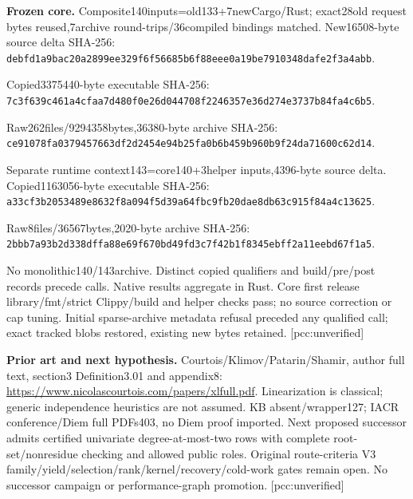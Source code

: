 \documentclass[10pt]{article}
\begin{document}
\textbf{Frozen core.} Composite140inputs=old133+7newCargo/Rust; exact28old
request bytes reused,7archive round-trips/36compiled bindings matched.
New16508-byte source delta SHA-256:\\
\texttt{debfd1a9bac20a2899ee329f6f56685b6f88eee0a19be7910348dafe2f3a4abb}.\par
Copied3375440-byte executable SHA-256:\\
\texttt{7c3f639c461a4cfaa7d480f0e26d044708f2246357e36d274e3737b84fa4c6b5}.\par
Raw262files/9294358bytes,36380-byte archive SHA-256:\\
\texttt{ce91078fa0379457663df2d2454e94b25fa0b6b459b960b9f24da71600c62d14}.\par
Separate runtime context143=core140+3helper inputs,4396-byte source delta.
Copied1163056-byte executable SHA-256:\\
\texttt{a33cf3b2053489e8632f8a094f5d39a64fbc9fb20dae8db63c915f84a4c13625}.\par
Raw8files/36567bytes,2020-byte archive SHA-256:\\
\texttt{2bbb7a93b2d338dffa88e69f670bd49fd3c7f42b1f8345ebff2a11eebd67f1a5}.\par
No monolithic140/143archive. Distinct copied qualifiers and build/pre/post
records precede calls. Native results aggregate in Rust. Core first release
library/fmt/strict Clippy/build and helper checks pass; no source correction
or cap tuning. Initial sparse-archive metadata refusal preceded any qualified
call; exact tracked blobs restored, existing new bytes retained. [pcc:unverified]

\textbf{Prior art and next hypothesis.} Courtois/Klimov/Patarin/Shamir,
author full text, section3 Definition3.01 and appendix8:
\url{https://www.nicolascourtois.com/papers/xlfull.pdf}.
Linearization is classical; generic independence heuristics are not assumed.
KB absent/wrapper127; IACR conference/Diem full PDFs403, no Diem proof imported.
Next proposed successor admits certified univariate degree-at-most-two rows
with complete root-set/nonresidue checking and allowed public roles. Original
route-criteria V3 family/yield/selection/rank/kernel/recovery/cold-work gates
remain open. No successor campaign or performance-graph promotion.
[pcc:unverified]
\end{document}
